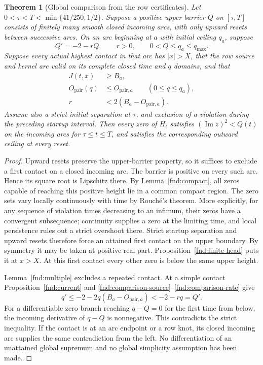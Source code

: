 \documentclass[11pt,a4paper]{article}
\newtheorem{theorem}{Theorem}[section]
\theoremstyle{definition}
\theoremstyle{remark}
\newcommand{\Imm}{\operatorname{Im}}
\begin{document}
\begin{theorem}[Global comparison from the row certificates]
\label{fnd:comparison}
Let $0<\tau<T<\min\{41/250,1/2\}$. Suppose a positive upper barrier
$Q$ on $[\tau,T]$ consists of finitely many smooth closed incoming arcs,
with only upward resets between successive arcs. On an arc beginning
at $a$ with initial ceiling $q_a$, suppose
\begin{equation}
 Q'=-2-rQ,\qquad r>0,
 \qquad 0<Q\leq q_a\leq q_{\max}.
 \label{fnd:comparisonode}
\end{equation}
Suppose every actual highest contact in that arc has $|x|>X$, that the
row source and kernel are valid on its complete closed time and
$q$ domains, and that
\begin{align}
 J(t,x)&\geq B_a,\label{fnd:comparison-source}\\
 O_{\mathrm{pair}}(q)&\leq O_{\mathrm{pair},a}\qquad(0\leq q\leq q_a),\label{fnd:comparison-own}\\
 r&<2(B_a-O_{\mathrm{pair},a}).\label{fnd:comparison-rate}
\end{align}
Assume also a strict initial separation at $\tau$, and exclusion of a
violation during the preceding startup interval. Then every zero of
$H_t$ satisfies $(\Imm z)^2<Q(t)$ on the incoming arcs for
$\tau\leq t\leq T$, and satisfies the corresponding outward ceiling at
every reset.
\end{theorem}
\begin{proof}
Upward resets preserve the upper-barrier property, so it suffices to
exclude a first contact on a closed incoming arc. The barrier is positive
on every such arc. Hence its square root is Lipschitz there.
By Lemma~\ref{fnd:compact}, all zeros capable of reaching this positive
height lie in a common compact region. The zero sets vary locally
continuously with time by Rouch\'e's theorem. More explicitly, for any
sequence of violation times decreasing to an infimum, their zeros have
a convergent subsequence; continuity supplies a zero at the limiting
time, and local persistence rules out a strict overshoot there. Strict
startup separation and upward resets therefore force an attained first
contact on the upper boundary. By symmetry it may be taken at positive
real part. Proposition~\ref{fnd:finite-head} puts it at $x>X$.
At this first contact every other zero is below the same upper height.

Lemma~\ref{fnd:multiple} excludes a repeated contact. At a simple contact
Proposition~\ref{fnd:current} and
\eqref{fnd:comparison-source}--\eqref{fnd:comparison-rate} give
\[
 q'\leq-2-2q(B_a-O_{\mathrm{pair},a})<-2-rq=Q'.
\]
For a differentiable zero branch reaching $q-Q=0$ for the first time
from below, the incoming derivative of $q-Q$ is nonnegative. This
contradicts the strict inequality. If the contact is at an arc endpoint
or a row knot, its closed incoming arc supplies the same contradiction
from the left. No differentiation of an unattained global supremum and
no global simplicity assumption has been made.
\end{proof}
\end{document}
